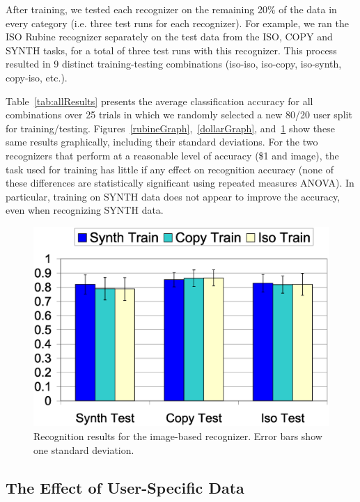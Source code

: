 \documentclass[final,5p,twocolumn]{elsarticle}
\begin{document}
After training, we tested each recognizer on the remaining 20\% 
of the data in
every category (i.e. three test runs for each recognizer).  For
example, we ran the ISO Rubine recognizer separately on the test data
from the ISO, COPY and SYNTH tasks, for a total of three test runs
with this recognizer.  This process resulted in 9 distinct
training-testing combinations (iso-iso, iso-copy, iso-synth, copy-iso,
etc.).

Table~\ref{tab:allResults} presents the average classification
accuracy for all combinations over 25 trials in which we randomly
selected a new 80/20 user split for training/testing.
Figures~\ref{rubineGraph},~\ref{dollarGraph}, and~\ref{visionGraph}
show these same results graphically, including their standard
deviations. For the two recognizers that perform at a reasonable level
of accuracy (\$1 and image), the task used for training has little if any
effect on recognition accuracy (none of these differences are
statistically significant using repeated measures ANOVA).  In
particular, training on SYNTH data does not appear to improve the
accuracy, even when recognizing SYNTH data.

\begin{figure}
\includegraphics[width=1.0\hsize]{image_global_summary.eps}
\caption{Recognition results for the image-based recognizer. Error bars show one standard deviation.}
\label{visionGraph}
\end{figure}

\subsection{The Effect of User-Specific Data}
\end{document}
